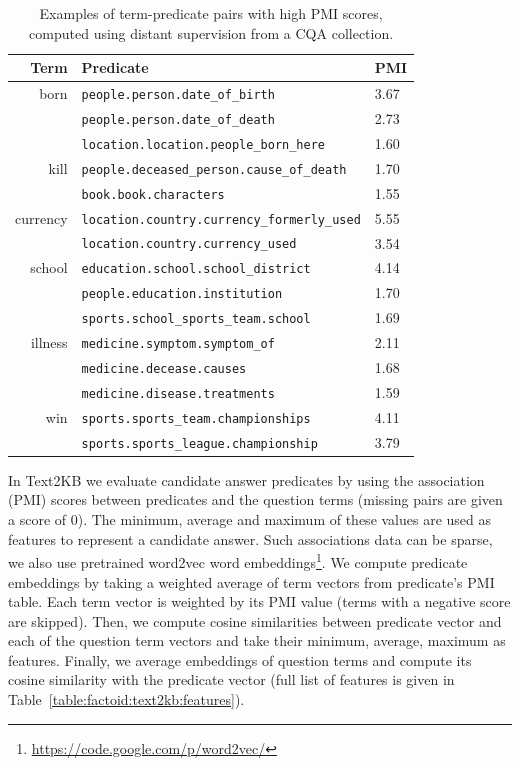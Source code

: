 \begin{table}[t]
\centering
\begin{tabular}{rp{8.5cm}l}
Term & Predicate & PMI\\
\hline
born & \texttt{people.person.date\_of\_birth} & 3.67\\
 & \texttt{people.person.date\_of\_death} & 2.73\\
 & \texttt{location.location.people\_born\_here} & 1.60\\
\hline
kill & \texttt{people.deceased\_person.cause\_of\_death} & 1.70\\
& \texttt{book.book.characters} & 1.55\\
\hline
currency & \texttt{location.country.currency\_formerly\_used} & 5.55 \\
& \texttt{location.country.currency\_used} & 3.54 \\
\hline
school & \texttt{education.school.school\_district} & 4.14 \\
& \texttt{people.education.institution} & 1.70\\
& \texttt{sports.school\_sports\_team.school} & 1.69 \\
\hline
illness & \texttt{medicine.symptom.symptom\_of} & 2.11\\
& \texttt{medicine.decease.causes} & 1.68\\
& \texttt{medicine.disease.treatments} & 1.59\\
\hline
win & \texttt{sports.sports\_team.championships} & 4.11\\
& \texttt{sports.sports\_league.championship} & 3.79\\
\end{tabular}
\caption{Examples of term-predicate pairs with high PMI scores, computed using distant supervision from a CQA collection.}
\label{table:factoid:text2kb:cqa_npmi}
\end{table}

In Text2KB we evaluate candidate answer predicates by using the association (\eg PMI) scores between predicates and the question terms (missing pairs are given a score of 0).
The minimum, average and maximum of these values are used as features to represent a candidate answer.
Such associations data can be sparse, we also use pretrained word2vec word embeddings\footnote{\href{url}{https://code.google.com/p/word2vec/}}.
We compute predicate embeddings by taking a weighted average of term vectors from predicate's PMI table.
Each term vector is weighted by its PMI value (terms with a negative score are skipped).
Then, we compute cosine similarities between predicate vector and each of the question term vectors and take their minimum, average, maximum as features.
Finally, we average embeddings of question terms and compute its cosine similarity with the predicate vector (full list of features is given in Table~\ref{table:factoid:text2kb:features}).

